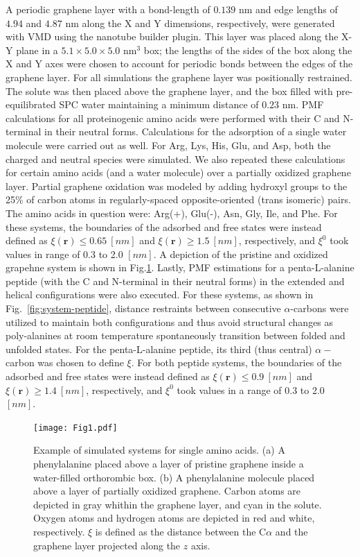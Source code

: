 \documentclass[journal=jcisd8,manuscript=article,layout=twocolumn]{achemso}
\begin{document}
A periodic graphene layer with a bond-length of $0.139$ nm and edge lengths of  $4.94$  and $4.87$ nm along the X and Y dimensions, respectively, were generated with VMD \cite{Humphrey_1996} using the nanotube builder plugin.
This layer was placed along the X-Y plane in a $5.1 \times 5.0 \times 5.0$ nm$^3$ box; the lengths of the sides of the box along the X and Y axes were chosen to account for periodic bonds between the edges of the graphene layer.
For all simulations the graphene layer was positionally restrained.
The solute was then placed above the graphene layer, and the box filled with pre-equilibrated SPC water maintaining a minimum distance  of $0.23$ nm.
PMF calculations for all  proteinogenic amino acids were performed with their C and N-terminal in their neutral forms.
Calculations for the adsorption of a single water molecule were carried out as well.
For Arg, Lys, His, Glu, and Asp, both the charged and neutral species were simulated.
We also repeated these calculations for certain amino acids (and a water molecule) over a partially oxidized graphene layer.
Partial graphene oxidation was modeled by adding  hydroxyl groups to the 25\% of carbon atoms in regularly-spaced opposite-oriented (trans isomeric) pairs.
The amino acids in question were: Arg(+), Glu(-), Asn, Gly, Ile, and Phe.
For these systems, the boundaries of the adsorbed and free states were instead defined as $\xi(\mathbf{r}) \leq 0.65~[nm]$ and $\xi(\mathbf{r}) \geq 1.5~[nm]$, respectively, and $\xi^0$ took values in range of 0.3 to 2.0 $[nm]$.
A depiction of the pristine and oxidized grapehne system is shown in Fig.\ref{fig:system-aminoacid}.
Lastly, PMF estimations for a penta-L-alanine peptide (with the C and N-terminal in their neutral forms) in the extended and helical configurations were also executed.
For these systems, as shown in Fig.~\ref{fig:system-peptide}, distance restraints between consecutive $\alpha$-carbons were utilized to maintain both configurations and thus avoid structural changes as poly-alanines at room temperature spontaneously transition between folded and unfolded states.\cite{Garate2019}
For the penta-L-alanine peptide, its third  (thus central) $\alpha-$carbon was chosen to define $\xi$.
For both peptide systems, the boundaries of the adsorbed and free states were instead defined as $\xi(\mathbf{r}) \leq 0.9~[nm]$ and $\xi(\mathbf{r}) \geq 1.4~[nm]$, respectively, and $\xi^0$ took values in a range of 0.3 to 2.0 $[nm]$.

\begin{figure}[htbp]
\centerline{\texttt{[image: Fig1.pdf]}}
\caption[]{\label{fig:system-aminoacid} Example of simulated systems for single amino acids. (a) A phenylalanine  placed above a layer of pristine
  graphene inside a water-filled orthorombic box. (b) A phenylalanine molecule placed above a layer of partially oxidized graphene. Carbon atoms are depicted in gray whithin  the graphene layer, and cyan in the solute. Oxygen atoms and hydrogen atoms are depicted in red and white, respectively. $\xi$ is defined as the distance between the C$\alpha$ and the graphene layer projected along the $z$ axis.}
\end{figure}
\end{document}
